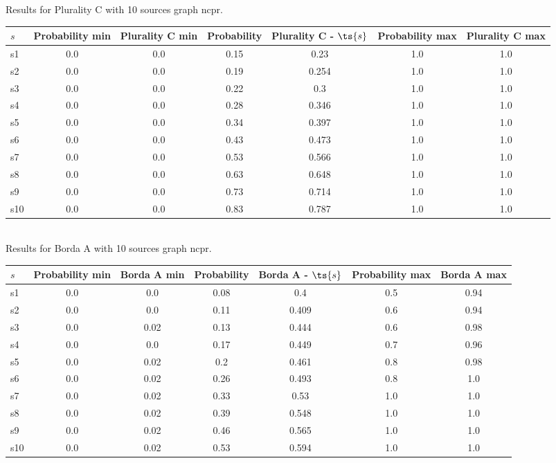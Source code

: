 \documentclass{article}
\begin{document}
\noindent Results for Plurality C with 10 sources graph ncpr.

\noindent\begin{tabular}{|l|c|c|c|c|c|c|}
\hline
$s$& Probability min & Plurality C min & Probability & Plurality C - $\ts{s}$ & Probability max & Plurality C max\\
\hline
s1 &0.0 & 0.0 & 0.15 & 0.23 & 1.0 & 1.0\\
\hline
s2 &0.0 & 0.0 & 0.19 & 0.254 & 1.0 & 1.0\\
\hline
s3 &0.0 & 0.0 & 0.22 & 0.3 & 1.0 & 1.0\\
\hline
s4 &0.0 & 0.0 & 0.28 & 0.346 & 1.0 & 1.0\\
\hline
s5 &0.0 & 0.0 & 0.34 & 0.397 & 1.0 & 1.0\\
\hline
s6 &0.0 & 0.0 & 0.43 & 0.473 & 1.0 & 1.0\\
\hline
s7 &0.0 & 0.0 & 0.53 & 0.566 & 1.0 & 1.0\\
\hline
s8 &0.0 & 0.0 & 0.63 & 0.648 & 1.0 & 1.0\\
\hline
s9 &0.0 & 0.0 & 0.73 & 0.714 & 1.0 & 1.0\\
\hline
s10 &0.0 & 0.0 & 0.83 & 0.787 & 1.0 & 1.0\\
\hline
\end{tabular}\\

\noindent Results for Borda A with 10 sources graph ncpr.

\noindent\begin{tabular}{|l|c|c|c|c|c|c|}
\hline
$s$& Probability min & Borda A min & Probability & Borda A - $\ts{s}$ & Probability max & Borda A max\\
\hline
s1 &0.0 & 0.0 & 0.08 & 0.4 & 0.5 & 0.94\\
\hline
s2 &0.0 & 0.0 & 0.11 & 0.409 & 0.6 & 0.94\\
\hline
s3 &0.0 & 0.02 & 0.13 & 0.444 & 0.6 & 0.98\\
\hline
s4 &0.0 & 0.0 & 0.17 & 0.449 & 0.7 & 0.96\\
\hline
s5 &0.0 & 0.02 & 0.2 & 0.461 & 0.8 & 0.98\\
\hline
s6 &0.0 & 0.02 & 0.26 & 0.493 & 0.8 & 1.0\\
\hline
s7 &0.0 & 0.02 & 0.33 & 0.53 & 1.0 & 1.0\\
\hline
s8 &0.0 & 0.02 & 0.39 & 0.548 & 1.0 & 1.0\\
\hline
s9 &0.0 & 0.02 & 0.46 & 0.565 & 1.0 & 1.0\\
\hline
s10 &0.0 & 0.02 & 0.53 & 0.594 & 1.0 & 1.0\\
\hline
\end{tabular}\\
\end{document}
